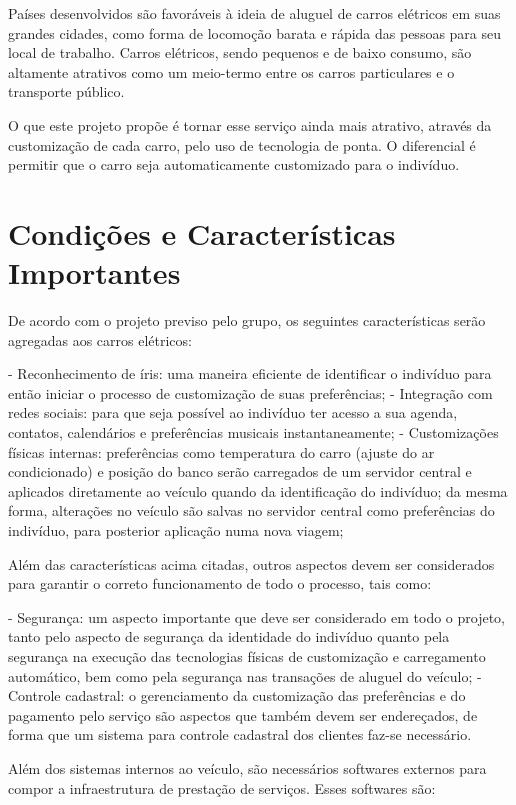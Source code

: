 \documentclass[12pt,journal,compsoc]{IEEEtran}
\begin{document}
Países desenvolvidos são favoráveis à ideia de aluguel de carros elétricos em suas grandes cidades, como forma de locomoção barata e rápida das pessoas para seu local de trabalho. Carros elétricos, sendo pequenos e de baixo consumo, são altamente atrativos como um meio-termo entre os carros particulares e o transporte público. 

O que este projeto propõe é tornar esse serviço ainda mais atrativo, através da customização de cada carro, pelo uso de tecnologia de ponta. O diferencial é permitir que o carro seja automaticamente customizado para o indivíduo. 


\section{Condições e Características Importantes}

De acordo com o projeto previso pelo grupo, os seguintes características serão agregadas aos carros elétricos:

- Reconhecimento de íris: uma maneira eficiente de identificar o indivíduo para então iniciar o processo de customização de suas preferências;
- Integração com redes sociais: para que seja possível ao indivíduo ter acesso a sua agenda, contatos, calendários e preferências musicais instantaneamente; 
- Customizações físicas internas: preferências como temperatura do carro (ajuste do ar condicionado) e posição do banco serão carregados de um servidor central e aplicados diretamente ao veículo quando da identificação do indivíduo; da mesma forma, alterações no veículo são salvas no servidor central como preferências do indivíduo, para posterior aplicação numa nova viagem;

Além das características acima citadas, outros aspectos devem ser considerados para garantir o correto funcionamento de todo o processo, tais como:

- Segurança: um aspecto importante que deve ser considerado em todo o projeto, tanto pelo aspecto de segurança da identidade do indivíduo quanto pela segurança na execução das tecnologias físicas de customização e carregamento automático, bem como pela segurança nas transações de aluguel do veículo;
- Controle cadastral: o gerenciamento da customização das preferências e do pagamento pelo serviço são aspectos que também devem ser endereçados, de forma que um sistema para controle cadastral dos clientes faz-se necessário.

Além dos sistemas internos ao veículo, são necessários softwares externos para compor a infraestrutura de prestação de serviços. Esses softwares são:
\end{document}

